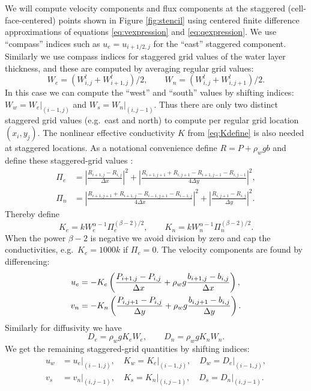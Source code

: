\documentclass[11pt,final]{amsart}
\begin{document}
We will compute velocity components and flux components at the staggered (cell-face-centered) points shown in Figure \ref{fig:stencil} using centered finite difference approximations of equations \eqref{eq:vexpression} and \eqref{eq:qexpression}.  We use ``compass'' indices such as $u_e = u_{i+1/2,j}$ for the ``east'' staggered component.  Similarly we use compass indices for staggered grid values of the water layer thickness, and these are computed by averaging regular grid values:
\begin{equation}
W_e = (W_{i,j}^l + W_{i+1,j}^l)/2, \qquad W_n = (W_{i,j}^l + W_{i,j+1}^l)/2. \label{eq:stagW}
\end{equation}
In this case we can compute the ``west'' and ``south'' values by shifting indices: $W_w = W_e\big|_{(i-1,j)}$ and $W_s = W_n\big|_{(i,j-1)}$.  Thus there are only two distinct staggered grid values (e.g.~east and north) to compute per regular grid location $(x_i,y_j)$.
The nonlinear effective conductivity $K$ from \eqref{eq:Kdefine} is also needed at staggered locations.  As a notational convenience define $R=P+\rho_w g b$ and define these staggered-grid values \citep[compare][]{Mahaffy}:
\begin{align*}
\Pi_e &= \left|\frac{R_{i+1,j}-R_{i,j}}{\Delta x}\right|^2 + \left|\frac{R_{i+1,j+1}+R_{i,j+1} - R_{i+1,j-1}-R_{i,j-1}}{4\Delta y}\right|^2, \\
\Pi_n &= \left|\frac{R_{i+1,j+1}+R_{i+1,j} - R_{i-1,j+1}-R_{i-1,j}}{4\Delta x}\right|^2 + \left|\frac{R_{i,j+1}-R_{i,j}}{\Delta y}\right|^2.
\end{align*}
Thereby define
\begin{equation}
K_e = k W_e^{\alpha-1} \Pi_e^{(\beta-2)/2}, \qquad K_n = k W_n^{\alpha-1} \Pi_n^{(\beta-2)/2}.  \label{eq:stagK}
\end{equation}
When the power $\beta-2$ is negative we avoid division by zero and cap the conductivities, e.g.~$K_e = 1000 k$ if $\Pi_e = 0$.  The velocity components are found by differencing:
\begin{align}
u_e &= - K_e \left(\frac{P_{i+1,j}-P_{i,j}}{\Delta x} + \rho_w g \frac{b_{i+1,j}-b_{i,j}}{\Delta x}\right),  \label{eq:velocitycomp} \\
v_n &= - K_n \left(\frac{P_{i,j+1}-P_{i,j}}{\Delta y} + \rho_w g \frac{b_{i,j+1}-b_{i,j}}{\Delta y}\right). \notag
\end{align}
Similarly for diffusivity we have
\begin{equation}
D_e = \rho_w g K_e W_e, \qquad D_n = \rho_w g K_n W_n.  \label{eq:diffusivitycomp}
\end{equation}
We get the remaining staggered-grid quantities by shifting indices:
\begin{align*}
u_w &= u_e\big|_{(i-1,j)}, \quad K_w = K_e\big|_{(i-1,j)}, \quad D_w = D_e\big|_{(i-1,j)}, \\
v_s &= v_n\big|_{(i,j-1)}, \quad K_s = K_n\big|_{(i,j-1)}, \quad D_s = D_n\big|_{(i,j-1)}.
\end{align*}
\end{document}
